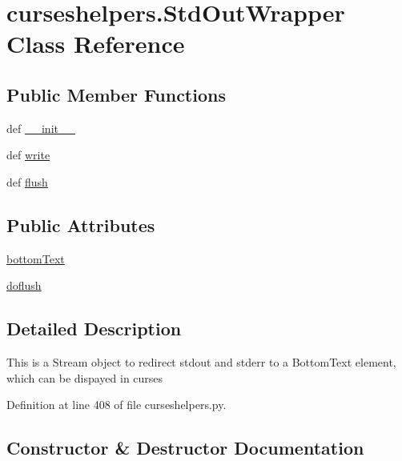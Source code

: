\section{curseshelpers.\-Std\-Out\-Wrapper Class Reference}
\label{classcurseshelpers_1_1StdOutWrapper}
\subsection*{Public Member Functions}
\begin{DoxyCompactItemize}
\item 
def \hyperlink{classcurseshelpers_1_1StdOutWrapper_ab959bab0d4f4f5717299ca9729262419}{\-\_\-\-\_\-init\-\_\-\-\_\-}
\item 
def \hyperlink{classcurseshelpers_1_1StdOutWrapper_afb94005ac7a4e91628fa43e98dfad6fb}{write}
\item 
def \hyperlink{classcurseshelpers_1_1StdOutWrapper_a892fe0f8e72212e0eac03c11151f12af}{flush}
\end{DoxyCompactItemize}
\subsection*{Public Attributes}
\begin{DoxyCompactItemize}
\item 
\hyperlink{classcurseshelpers_1_1StdOutWrapper_a107fbcad070676b8f2132726f2b7ee28}{bottom\-Text}
\item 
\hyperlink{classcurseshelpers_1_1StdOutWrapper_a8d111b0ad072db53b8283a98ec809972}{doflush}
\end{DoxyCompactItemize}


\subsection{Detailed Description}
\begin{DoxyVerb}This is a Stream object to redirect stdout and stderr to a BottomText element, which
can be dispayed in curses
\end{DoxyVerb}
 

Definition at line 408 of file curseshelpers.\-py.



\subsection{Constructor \& Destructor Documentation}
